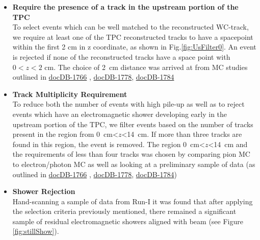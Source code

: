 \begin{itemize}
\item{\textbf{Require the presence of a track in the upstream portion of the TPC}}\\

To select events which can be well matched to the reconstructed WC-track, we require at least one of the TPC reconstructed tracks to have a spacepoint within the first 2 cm in z coordinate, as shown in Fig.\ref{fig:UsFilter0}. An event is rejected if none of the reconstructed tracks have a space point with $0 < z < 2$ cm. The choice of 2~cm distance was arrived at from MC studies outlined in \href{https://lartpc-docdb.fnal.gov:441/cgi-bin/ShowDocument?docid=1766}{docDB-1766} , \href{https://lartpc-docdb.fnal.gov:441/cgi-bin/ShowDocument?docid=1778}{docDB-1778}, \href{https://lartpc-docdb.fnal.gov:441/cgi-bin/ShowDocument?docid=1784}{docDB-1784}

\item{\textbf{Track Multiplicity Requirement}}\\
To reduce both the number of events with high pile-up as well as to reject events which have an electromagnetic shower developing early in the upstream portion of the TPC, we filter events based on the number of tracks present in the region from 0~cm<$z$<14~cm. If more than three tracks are found in this region, the event is removed. The region 0~cm<$z$<14~cm and the requirements of less than four tracks was chosen by comparing pion MC to electron/photon MC as well as looking at a preliminary sample of data (as outlined in \href{https://lartpc-docdb.fnal.gov:441/cgi-bin/ShowDocument?docid=1766}{docDB-1766} , \href{https://lartpc-docdb.fnal.gov:441/cgi-bin/ShowDocument?docid=1778}{docDB-1778}, \href{https://lartpc-docdb.fnal.gov:441/cgi-bin/ShowDocument?docid=1784}{docDB-1784})

\item{\textbf{Shower Rejection}}\\

Hand-scanning a sample of data from Run-I it was found that after applying the selection criteria previously mentioned, there remained a significant sample of residual electromagnetic showers aligned with beam (see Figure \ref{fig:stillShow}). 


\end{itemize}
